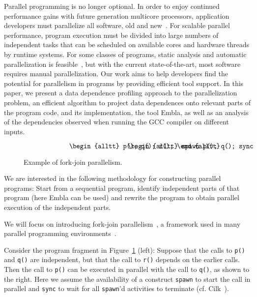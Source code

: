 \documentclass[times, 10pt,twocolumn]{article}
\begin{document}
Parallel programming is no longer optional.  In order to enjoy continued
performance gains with future generation multicore processors,
application developers must parallelize all software, old and
new~\cite{TEL95,ONHWC96,KAB03,VIAVAC05}.  For scalable parallel
performance, program execution must be divided into large numbers of
independent tasks that can be scheduled on available cores and hardware
threads by runtime systems.  For some classes of programs, static
analysis and automatic parallelization is feasible~\cite{KA02}, but with
the current state-of-the-art, most software requires manual
parallelization.  Our work aims to help developers find the potential
for parallelism in programs by providing efficient tool
support.  In this paper, we present a data dependence profiling approach
to the parallelization problem, an efficient algorithm to project data
dependences onto relevant parts of the program code, and its
implementation, the tool Embla, as well as an analysis of the dependencies 
observed when running the GCC compiler on different inputs.

\begin{figure}
\small
\hrulefill
\[
\begin{minipage}[t]{3cm}
\begin{alltt}
   p();
   q();
   r();
\end{alltt}
\end{minipage}
\begin{minipage}[t]{3cm}
\begin{alltt}
   spawn p();
   q();
   sync;
   r();
\end{alltt}
\end{minipage} 
\]
\hrulefill
\caption{Example of fork-join parallelism.}
\label{fforkjoin}
\end{figure}

We are interested in the following methodology for constructing
parallel programs: Start from a sequential program, identify
independent parts of that program (here Embla can be used) and rewrite
the program to obtain parallel execution of the independent parts.

We will focus on introducing
fork-join parallelism~\cite{Conway63}, a framework used
in many parallel programming environments~\cite{BJKLR96, Lea00, DM98, LF00}.

Consider the program fragment in
Figure~\ref{fforkjoin} (left):
Suppose that the calls to {\tt p()} and {\tt q()} are independent,
but that the call to {\tt r()} depends on the earlier calls. Then
the call to {\tt p()} can be
executed in parallel with
the call to {\tt q()}, as shown to the right.
Here we assume the availability of a construct {\tt spawn} to start
the call in parallel and {\tt sync} to wait for all {\tt spawn}'d
activities to terminate (cf. Cilk~\cite{BJKLR96}).
\end{document}
